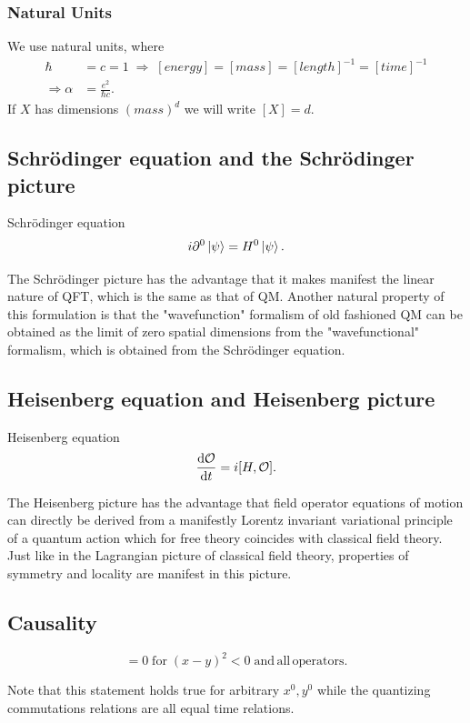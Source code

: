 \subsubsection{Natural Units}
We use natural units, where 
\begin{align*}
	\hbar &= c = 1 \; \Rightarrow \; [energy]=[mass]=[length]^{-1}=[time]^{-1} \\
	\Rightarrow \alpha &= \frac{e^2}{\hbar c}.
\end{align*}
If $X$ has dimensions $(mass)^d$ we will write $[X]=d$.


\subsection{Schrödinger equation and the Schrödinger picture}
\begin{mybox}{Schrödinger equation}
	\begin{equation}
		i \partial^0 \ket{\psi} = H^0 \ket{\psi}.
	\end{equation}
\end{mybox}
The Schrödinger picture has the advantage that it makes manifest the linear nature of QFT, which is the same as that of QM. Another natural property of this formulation is that the "wavefunction" formalism of old fashioned QM can be obtained as the limit of zero spatial dimensions from the "wavefunctional" formalism, which is obtained from the Schrödinger equation.
\subsection{Heisenberg equation and Heisenberg picture}
\begin{mybox}{Heisenberg equation}
	\begin{equation}
	\frac{\mathrm{d} \mathcal{O}}{\mathrm{d} t} = i [H,\mathcal{O}].
	\end{equation}
\end{mybox}
The Heisenberg picture has the advantage that field operator equations of motion can directly be derived from a manifestly Lorentz invariant variational principle of a quantum action which for free theory coincides with classical field theory. Just like in the Lagrangian picture of classical field theory, properties of symmetry and locality are manifest in this picture.
\subsection{Causality}
\begin{mybox}{}
	\begin{equation}
			[\mO_i(x),\mO_j(y)] = 0 \; \mathrm{for}\; (x-y)^2 <0 \mathrm{\; and \, all \,operators}.
	\end{equation}
\end{mybox}
Note that this statement holds true for arbitrary $x^0,y^0$ while the quantizing commutations relations are all equal time relations.
